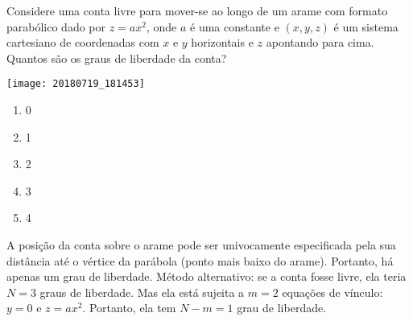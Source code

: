 \begin{question}
    Considere uma conta livre para mover-se ao longo de um arame com formato parabólico dado por $z = ax^2$, onde $a$ é uma constante e $(x,y,z)$ é um sistema cartesiano de coordenadas com $x$ e $y$ horizontais e $z$ apontando para cima.
    Quantos são os graus de liberdade da conta?

    \begin{center}
      \texttt{[image: 20180719\_181453]}
    \end{center}

    \begin{enumerate}
      \item 0
      \item 1 \rightanswer
      \item 2
      \item 3
      \item 4
    \end{enumerate}

    \begin{solution}
      A posição da conta sobre o arame pode ser univocamente especificada pela sua distância até o vértice da parábola (ponto mais baixo do arame).
      Portanto, há apenas um grau de liberdade.
      Método alternativo: se a conta fosse livre, ela teria $N = 3$ graus de liberdade.
      Mas ela está sujeita a $m = 2$ equações de vínculo: $y = 0$ e $z = ax^2$.
      Portanto, ela tem $N - m = 1$ grau de liberdade.
    \end{solution}
\end{question}